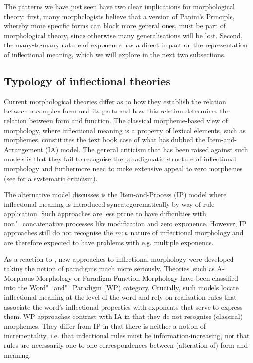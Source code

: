 \documentclass[output=paper
	        ,collection
	        ,collectionchapter
 	        ,biblatex
                ,babelshorthands
                ,newtxmath
                ,draftmode
                ,colorlinks, citecolor=brown
]{langscibook}
\begin{document}
The patterns we have just seen have two clear implications for
morphological theory: first, many morphologists believe that
a version of Pāṇini's Principle, whereby more specific forms can block
more general ones, must be part of morphological theory, since
otherwise many generalisations will be lost. 
Second, the many-to-many nature of exponence has a direct impact on
the representation of inflectional meaning, which we will explore in
the next two subsections. 

\subsection{Typology of inflectional theories}
\label{sec:InflTypology}

Current morphological theories differ as to how they establish the
relation between a complex form and its parts and how this relation
determines the relation between form and function. The classical
morpheme-based view of morphology, where inflectional meaning is a
property of lexical elements, such as morphemes, constitutes the text
book case of what \cite{Hockett54} has dubbed the Item-and-Arrangement
(IA) model.  The general criticism that has been raised against such
models is that they fail to recognise the paradigmatic structure of
inflectional morphology and furthermore need to make extensive appeal
to zero morphemes (see \citealp{Anderson92} for a systematic
criticism).

The alternative model \citet{Hockett54} discusses is the
Item-and-Process (IP) model where inflectional meaning is introduced
syncategorematically by way of rule application. Such approaches
are less prone to have difficulties with non"=concatenative processes
like modification and zero exponence. However, IP approaches still do
not recognise the $m:n$ nature of inflectional morphology and are
therefore expected to have problems with e.g. multiple exponence. 


As a reaction to \citet{Matthews72}, new approaches to inflectional
morphology were developed taking the notion of paradigms much more
seriously. Theories, such as A-Morphous Morphology \citep{Anderson92}
or Paradigm Function Morphology \citep{Stump01} have been classified
into the Word"=and"=Paradigm (WP) category. Crucially, such models
locate 
inflectional meaning at the level of the word and rely on
realisation rules that associate the word's inflectional properties
with exponents that serve to express them. WP approaches contrast with
IA in that they do not recognise (classical) morphemes. They differ
from IP in that there is neither a  notion of incrementality,
i.e. that inflectional rules must be information-increasing, nor that
rules are necessarily one-to-one correspondences between (alteration
of) form and meaning. 
\end{document}

